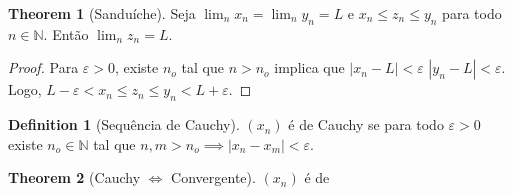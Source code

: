\documentclass[10pt]{article}
\theoremstyle{definition}
\newtheorem{definition}{Definition}[section]
\newtheorem{theorem}{Theorem}
\begin{document}
\begin{theorem}[Sanduíche]
	Seja $\lim_n x_n = \lim_n y_n = L$ e $x_n \leq z_n \leq y_n$ para todo $n \in \mathbb N$. Então
	$\lim_n z_n = L$.
\end{theorem}
\begin{proof}
	Para $\varepsilon > 0$, existe $n_o$ tal que $n>n_o$ implica que
	$|x_n - L| < \varepsilon$
	$|y_n - L| < \varepsilon$. Logo, $L - \varepsilon < x_n \leq z_n \leq y_n < L + \varepsilon$.
\end{proof}

\begin{definition}[Sequência de Cauchy]
	$(x_n)$ é de Cauchy se para todo $\varepsilon >0$ existe $n_o \in \mathbb N$ tal que
	$n,m > n_o \implies |x_n - x_m|<\varepsilon$.
\end{definition}
\begin{theorem}[Cauchy $\iff$ Convergente]
	$(x_n)$ é de 
\end{theorem}

  
  
\end{document}
